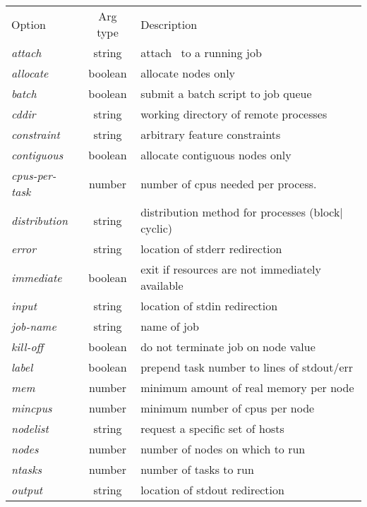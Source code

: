 \begin{table}[htb]
\begin{center}
  \begin{tabular}[t]{lcl}
   \hhline{---}
      Option & Arg type & Description \\
   \hhline{---}
      {\em attach}	   & string & attach \srun\ to a running job	      \\
      {\em allocate}	   & boolean& allocate nodes only		      \\
      {\em batch}	   & boolean& submit a batch script to job queue      \\
      {\em cddir}	   & string & working directory of remote processes   \\
      {\em constraint}     & string & arbitrary feature constraints	      \\
      {\em contiguous}	   & boolean& allocate contiguous nodes only	      \\
      {\em cpus-per-task } & number & number of cpus needed per process.      \\
      {\em distribution}   & string & distribution method for processes (block$|$cyclic) \\
      {\em error}	   & string & location of stderr redirection	      \\
      {\em immediate}	   & boolean& exit if resources are not immediately available  \\
      {\em input}	   & string & location of stdin redirection	      \\
      {\em job-name}	   & string & name of job 			      \\
      {\em kill-off}	   & boolean& do not terminate job on node value      \\
      {\em label}	   & boolean& prepend task number to lines of stdout/err \\
      {\em mem}		   & number & minimum amount of real memory per node  \\
      {\em mincpus} 	   & number & minimum number of cpus per node         \\
      {\em nodelist}	   & string & request a specific set of hosts	      \\
      {\em nodes}	   & number & number of nodes on which to run	      \\
      {\em ntasks}         & number & number of tasks to run     	      \\
      {\em output}         & string & location of stdout redirection	      \\

\end{tabular}
\end{center}
\end{table}
